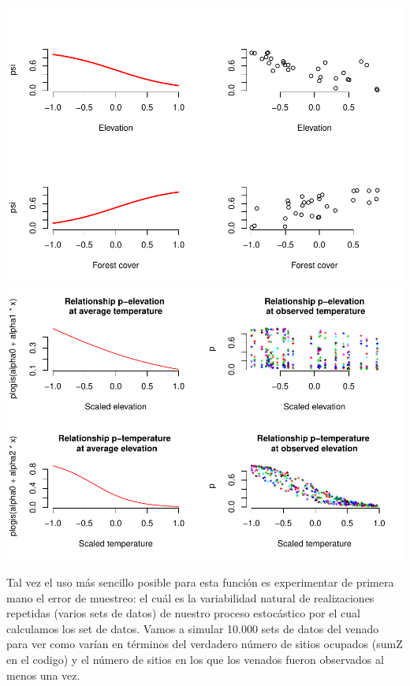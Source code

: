 \documentclass[]{book}
\begin{document}
\includegraphics{Simul-Machalilla-book_files/figure-latex/funcall1b-1.pdf}
\includegraphics{Simul-Machalilla-book_files/figure-latex/funcall1b-2.pdf}

Tal vez el uso más sencillo posible para esta función es experimentar de
primera mano el error de muestreo: el cuál es la variabilidad natural de
realizaciones repetidas (varios sets de datos) de nuestro proceso
estocástico por el cual calculamos los set de datos. Vamos a simular
10.000 sets de datos del venado para ver como varían en términos del
verdadero número de sitios ocupados (sumZ en el codigo) y el número de
sitios en los que los venados fueron observados al menos una vez.
\end{document}
